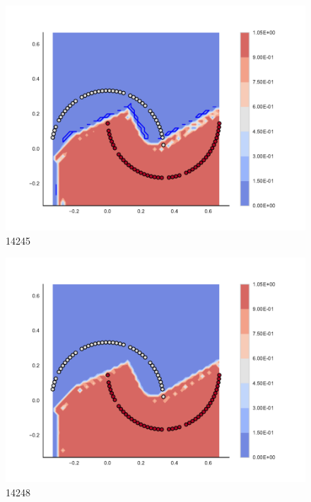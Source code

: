 \begin{subfigure}[b]{0.09\textwidth}
    \includegraphics[clip, trim=2.35cm 1.75cm 4.5cm 0cm,width=\textwidth]{img/convergence/14245.pdf}
    \caption{14245}
    \label{fig:convergence_14245}
\end{subfigure}
%
\begin{subfigure}[b]{0.09\textwidth}
    \includegraphics[clip, trim=2.35cm 1.75cm 4.5cm 0cm,width=\textwidth]{img/convergence/14248.pdf}
    \caption{14248}
    \label{fig:convergence_14248}
\end{subfigure}
%
